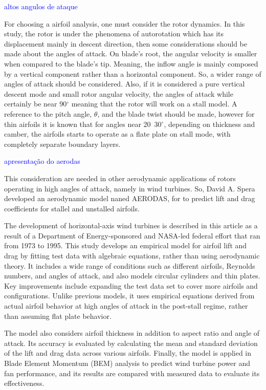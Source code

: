 \textcolor{blue}{altos angulos de ataque}

For choosing a airfoil analysis, one must consider the rotor dynamics. In this study, the rotor is under the phenomena of autorotation which has its displacement mainly in descent direction, then some considerations should be made about the angles of attack. On blade's root, the angular velocity is smaller when compared to the blade's tip. Meaning, the inflow angle is mainly composed by a vertical component rather than a horizontal component. So, a wider range of angles of attack should be considered. Also, if it is considered a pure vertical descent mode and small rotor angular velocity, the angles of attack while certainly be near 90$^{\circ}$ meaning that the rotor will work on a stall model. A reference to the pitch angle, $\theta$, and the blade twist should be made, however for thin airfoils it is known that for angles near 20~30$^{\circ}$, depending on thickness and camber, the airfoils starts to operate as a flate plate on stall mode, with completely separate boundary layers.

\textcolor{blue}{apresentação do aerodas}

This consideration are needed in other aerodynamic applications of rotors operating in high angles of attack, namely in wind turbines. So, David A. Spera developed an aerodynamic model \cite{spera_models_2008} naned AERODAS, for to predict lift and drag coefficients for stallel and unstalled airfoils. 

The development of horizontal-axis wind turbines is described in this article as a result of a Department of Energy-sponsored and NASA-led federal effort that ran from 1973 to 1995. This study develops an empirical model for airfoil lift and drag by fitting test data with algebraic equations, rather than using aerodynamic theory. It includes a wide range of conditions such as different airfoils, Reynolds numbers, and angles of attack, and also models circular cylinders and thin plates. Key improvements include expanding the test data set to cover more airfoils and configurations. Unlike previous models, it uses empirical equations derived from actual airfoil behavior at high angles of attack in the post-stall regime, rather than assuming flat plate behavior. 

The model also considers airfoil thickness in addition to aspect ratio and angle of attack. Its accuracy is evaluated by calculating the mean and standard deviation of the lift and drag data across various airfoils. Finally, the model is applied in Blade Element Momentum (BEM) analysis to predict wind turbine power and fan performance, and its results are compared with measured data to evaluate its effectiveness.

